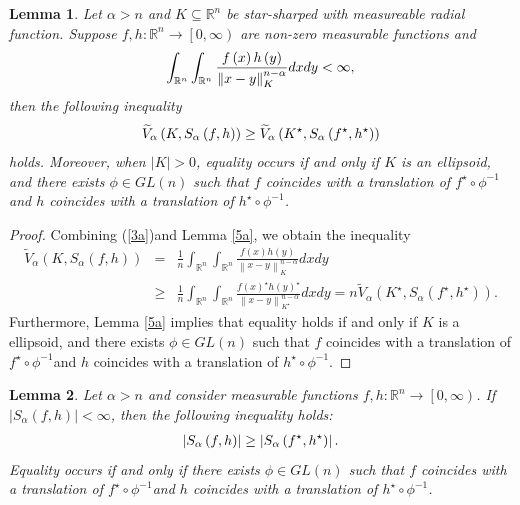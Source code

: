 \documentclass[preprint,12pt]{elsarticle}
\newtheorem{lem}{Lemma}
\begin{document}
\begin{lem}\label{5b}
Let $\alpha > n$ and $K\subseteq \mathbb{R}^n$ be star-sharped with measureable radial function. Suppose $f,h:\mathbb{R}^n \longrightarrow \left [ 0,\infty  \right ) $  are non-zero  measurable functions and
\begin{eqnarray}
\int_{\mathbb{R}^n}\int_{\mathbb{R}^n}\frac{f\left ( x \right )h\left ( y \right )  }{\left \| x-y \right \|^{n-\alpha } _{K} }dxdy  < \infty ,\notag
\end{eqnarray}
then the following inequality 
\begin{eqnarray}
\widetilde{V}_{\alpha } \left ( K,S_{\alpha }\left ( f,h \right )   \right )\ge\widetilde{V}_{\alpha } \left ( K^{\star } ,S_{\alpha }\left ( f^{\star } ,h^{\star }  \right )   \right )\notag
\end{eqnarray}
holds. Moreover, when $\left | K \right |> 0 $, equality occurs if and only if $K$ is an ellipsoid, and there exists  $\phi\in GL\left ( n \right ) $ such that $f$ coincides with a translation of $ f^{\star }\circ \phi^{-1} $and $h$  coincides with a translation of $h^{\star }\circ \phi^{-1}$.  
\end{lem}
\begin{proof}
Combining (\ref{3a})and Lemma \ref{5a}, we obtain the inequality
\begin{eqnarray*}
	\widetilde{V}_{\alpha} (K,{S}_{\alpha }(f,h))
	&=&\frac{1}{n}\int_{\mathbb{R}^n}\int_{\mathbb{R}^n}\frac{f(x)h(y)}{{\left \| x-y\right \|}_{K }^{n-\alpha}}dxdy\nonumber\\
	&\ge&  \frac{1}{n}\int_{\mathbb{R}^n}\int_{\mathbb{R}^n}\frac{f(x)^{\star }h(y)^{\star }}{{\left \| x-y\right \|}_{K ^{\star }}^{n-\alpha}}dxdy= n\widetilde{V}_{\alpha} (K^{\star },{S}_{\alpha }(f^{\star },h^{\star })).
\end{eqnarray*}
Furthermore, Lemma \ref{5a} implies that equality holds if and only if $K$ is a ellipsoid, and there exists  $\phi \in GL\left ( n \right ) $ such that $f$ coincides with a translation of $ f^{\star }\circ \phi^{-1} $and $h$  coincides with a translation of $h^{\star }\circ \phi^{-1}$. 
\end{proof}
\begin{lem}\label{5c}
Let $\alpha > n$ and consider measurable functions $f, h:\mathbb{R}^n \rightarrow \left [ 0,\infty  \right ) $. If $\left | S_{\alpha }\left ( f,h \right )   \right |<  \infty   $, then the following inequality holds:
\begin{eqnarray}
\left | S_{\alpha }\left ( f,h \right )   \right |\ge\left | S_{\alpha }\left ( f^{\star } ,h^{\star }  \right )   \right |.\notag
\end{eqnarray}
Equality occurs if and only if there exists  $\phi\in GL\left ( n \right ) $ such that $f$ coincides with a translation of $ f^{\star }\circ \phi^{-1} $and $h$  coincides with a translation of $h^{\star }\circ \phi^{-1}$.
\end{lem}
\end{document}

